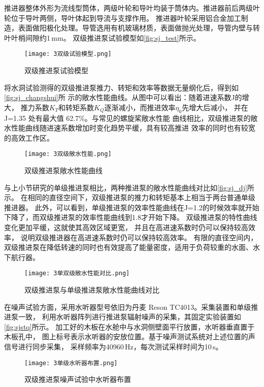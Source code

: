 推进器整体外形为流线型筒体，两级叶轮和导叶均装于筒体内。推进器前后两级叶轮位于导叶两侧，导叶体起到导流与支撑作用。
推进器叶轮采用铝合金加工制造，表面做阳极化处理。导管选用有机玻璃材质，表面做抛光处理，导管内壁与转叶叶梢间隙约1\,mm。
双级推进泵试验模型如\autoref{fig:sj_test}所示。
\begin{figure}[htbp]
    \centering
    \texttt{[image: 3双级试验模型.png]}
    \caption{\label{fig:sj_test}双级推进泵试验模型}
\end{figure}

将水洞试验测得的双级推进泵推力、转矩和效率等数据无量纲化后，得到如\autoref{fig:sj_changshui}所
示的敞水性能曲线。从图中可以看出：随着进速系数J的增大，
推力系数$K_T$和转矩系数$K_Q$逐渐减小，而推进效率$\eta_0$先增大后减小，
并在 J=1.35 处有最大值 62.7\%。与常见的螺旋桨敞水性能
曲线相比，双级推进泵的敞水性能曲线随进速系数增加时变化趋势平缓，具有较高推进
效率的同时也有较宽的高效工作区。
\begin{figure}[htbp]
    \centering
    \texttt{[image: 3双级敞水性能.png]}
    \caption{\label{fig:sj_changshui}双级推进泵敞水性能曲线}
\end{figure}

与上小节研究的单级推进泵相比，两种推进泵的敞水性能曲线对比如\autoref{fig:sj_dj}所示。
在相同的直径空间下，双级推进泵的推力和转矩基本上相当于两台普通单级推进器。
此外，可以看到，单级推进泵的效率性能曲线在J=1.2的时候效率就开始下降了，而双级推进泵的效率性能曲线到1.8才开始下降。
双级推进泵的特性曲线变化更加平缓，这就使其高效区域更宽，
并且在高进速系数时仍可以保持较高效率，
说明双级推进器在高进速系数时仍可以保持较高效率。
有限的直径空间内，双级推进泵在降低转速的同时也有效提高了能量密度，适用于负荷较重的水面、水下航行器。
\begin{figure}[htbp]
    \centering
    \texttt{[image: 3单双级敞水性能对比.png]}
    \caption{\label{fig:sj_dj}双级推进泵与单级推进泵敞水性能曲线对比}
\end{figure}

在噪声试验方面，采用水听器型号依旧为丹麦 Reson TC4013。采集装置和单级推进泵一致，
利用水听器阵列进行推进泵辐射噪声的采集，其固定实验装置如\autoref{fig:sjstq}所示。
加工好的木板在水舱中与水洞侧壁面平行放置，水听器垂直置于木板孔中，
图上标号表示水听器的安放位置。基于噪声测试系统对上述位置的声信号进行同步采集，
采样频率为40960\,Hz，每次测试采样时间为10\,s。
\begin{figure}[htbp]
    \centering
    \texttt{[image: 3单级水听器布置.png]}
    \caption{\label{fig:sjstq}双级推进泵噪声试验中水听器布置}
\end{figure}
